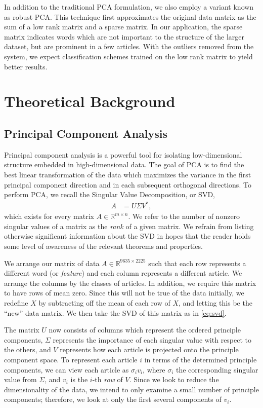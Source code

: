 \documentclass[12pt]{article}
\newcommand{\R}{\mathbb{R}}
\begin{document}
In addition to the traditional PCA formulation, we also employ a variant known as robust PCA. This technique first approximates the original data matrix as the sum of a low rank matrix and a sparse matrix. In our application, the sparse matrix indicates words which are not important to the structure of the larger dataset, but are prominent in a few articles. With the outliers removed from the system, we expect classification schemes trained on the low rank matrix to yield better results. 

\section{Theoretical Background}

\subsection{Principal Component Analysis
}
Principal component analysis is a powerful tool for isolating low-dimensional
structure embedded in high-dimensional data. The goal of PCA is to find the best
linear transformation of the data which maximizes the variance in the first principal component direction and in each subsequent orthogonal directions. To perform PCA, we recall the Singular Value Decomposition, or SVD, 
\begin{align} 
A &= U \Sigma V^*,
\label{eq:svd}
\end{align}
which exists for every matrix $A \in \R^{m \times n}.$ We refer to the number of nonzero singular values of a matrix as the \emph{rank} of a given matrix. We refrain from listing otherwise significant information about the SVD in hopes that the reader holds some level of awareness of the relevant theorems and properties. 

We arrange our matrix of data $A \in \R^{ 9635 \times 2225 } $ such that each row represents a different word (or \emph{feature}) and each column represents a different article. We arrange the columns by the classes of articles. In addition, we require this matrix to have rows of mean zero. Since this will not be true of the data initially, we redefine $X$ by subtracting off the mean of each row of $X$, and letting this be the ``new'' data matrix. We then take the SVD of this matrix as in \eqref{eq:svd}.

The matrix $U$ now consists of columns which represent the ordered principle components, $\Sigma$ represents the importance of each singular value with respect to the others, and $V$ represents how each article is projected onto the principle component space. To represent each article $i$ in terms of the determined principle components, we can view each article as $\sigma_i v_i $, where $\sigma_i$ the corresponding singular value from $\Sigma$, and $v_i$ is the $i$-th \emph{row} of $V$. Since we look to reduce the dimensionality of the data, we intend to only examine a small number of principle components; therefore, we look at only the first several components of $v_i$.
\end{document}
